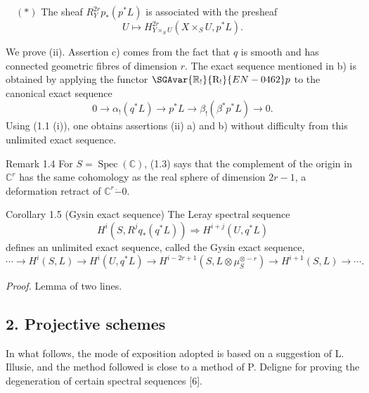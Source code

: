 \(\quad (*)\) The sheaf $R_Y^{2r}p_*(p^*L)$ is associated with the presheaf
\[
U\longmapsto H^{2r}_{Y\times_S U}(X\times_S U,p^*L).
\]

We prove (ii). Assertion c) comes from the fact that $q$ is smooth and has connected geometric fibres of dimension $r$. The exact sequence mentioned in b) is obtained by applying the functor $\SGAvar{\mathbb{R}_!}{\mathrm{R}_!}{EN-0462}p$ to the canonical exact sequence
\[
0\longrightarrow \alpha_!(q^*L)\longrightarrow p^*L\longrightarrow \beta_!(\beta^*p^*L)\longrightarrow 0.
\]
Using (1.1 (i)), one obtains assertions (ii) a) and b) without difficulty from this unlimited exact sequence.

\begin{statement}{Remark 1.4}
For $S=\operatorname{Spec}(\mathbb C)$, (1.3) says that the complement of the origin in $\mathbb C^r$ has the same cohomology as the real sphere of dimension $2r-1$, a deformation retract of $\mathbb C^r\mathbin{\dot{-}}0$.
\end{statement}

\begin{statement}{Corollary 1.5 (Gysin exact sequence)}
The Leray spectral sequence
\[
H^i(S,R^j q_*(q^*L))\Rightarrow H^{i+j}(U,q^*L)
\]
defines an unlimited exact sequence, called the Gysin exact sequence,
\[
\cdots\longrightarrow H^i(S,L)\longrightarrow H^i(U,q^*L)\longrightarrow
H^{i-2r+1}(S,L\otimes\mu_S^{\otimes -r})\longrightarrow H^{i+1}(S,L)\longrightarrow\cdots.
\]
\end{statement}

\emph{Proof.} Lemma of two lines.

\subsection*{2. Projective schemes}

In what follows, the mode of exposition adopted is based on a suggestion of L. Illusie, and the method followed is close to a method of P. Deligne for proving the degeneration of certain spectral sequences [6].

